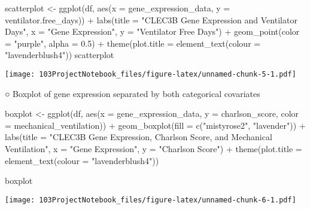 \documentclass[
]{article}
\newenvironment{Shaded}{\begin{snugshade}}{\end{snugshade}}
\newcommand{\AttributeTok}[1]{\textcolor[rgb]{0.77,0.63,0.00}{#1}}
\newcommand{\FloatTok}[1]{\textcolor[rgb]{0.00,0.00,0.81}{#1}}
\newcommand{\FunctionTok}[1]{\textcolor[rgb]{0.00,0.00,0.00}{#1}}
\newcommand{\NormalTok}[1]{#1}
\newcommand{\OtherTok}[1]{\textcolor[rgb]{0.56,0.35,0.01}{#1}}
\newcommand{\SpecialCharTok}[1]{\textcolor[rgb]{0.00,0.00,0.00}{#1}}
\newcommand{\StringTok}[1]{\textcolor[rgb]{0.31,0.60,0.02}{#1}}
\begin{document}
\begin{Shaded}
\begin{Highlighting}[]
\NormalTok{scatterplot }\OtherTok{\textless{}{-}} \FunctionTok{ggplot}\NormalTok{(df, }\FunctionTok{aes}\NormalTok{(}\AttributeTok{x =}\NormalTok{ gene\_expression\_data, }\AttributeTok{y =}\NormalTok{ ventilator.free\_days)) }\SpecialCharTok{+} 
    \FunctionTok{labs}\NormalTok{(}\AttributeTok{title =} \StringTok{"CLEC3B Gene Expression and Ventilator Days"}\NormalTok{, }\AttributeTok{x =} \StringTok{"Gene Expression"}\NormalTok{, }\AttributeTok{y =} \StringTok{"Ventilator Free Days"}\NormalTok{) }\SpecialCharTok{+}
    \FunctionTok{geom\_point}\NormalTok{(}\AttributeTok{color =} \StringTok{"purple"}\NormalTok{, }\AttributeTok{alpha =} \FloatTok{0.5}\NormalTok{) }\SpecialCharTok{+}
    \FunctionTok{theme}\NormalTok{(}\AttributeTok{plot.title =} \FunctionTok{element\_text}\NormalTok{(}\AttributeTok{colour =} \StringTok{"lavenderblush4"}\NormalTok{))}
\NormalTok{scatterplot}
\end{Highlighting}
\end{Shaded}

\texttt{[image: 103ProjectNotebook\_files/figure-latex/unnamed-chunk-5-1.pdf]}

○ Boxplot of gene expression separated by both categorical covariates

\begin{Shaded}
\begin{Highlighting}[]
\NormalTok{boxplot }\OtherTok{\textless{}{-}} \FunctionTok{ggplot}\NormalTok{(df, }\FunctionTok{aes}\NormalTok{(}\AttributeTok{x =}\NormalTok{ gene\_expression\_data, }\AttributeTok{y =}\NormalTok{ charlson\_score, }\AttributeTok{color =}\NormalTok{ mechanical\_ventilation)) }\SpecialCharTok{+} 
  \FunctionTok{geom\_boxplot}\NormalTok{(}\AttributeTok{fill =} \FunctionTok{c}\NormalTok{(}\StringTok{"mistyrose2"}\NormalTok{, }\StringTok{"lavender"}\NormalTok{)) }\SpecialCharTok{+}
  \FunctionTok{labs}\NormalTok{(}\AttributeTok{title =} \StringTok{"CLEC3B Gene Expression, Charlson Score, and Mechanical Ventilation"}\NormalTok{, }\AttributeTok{x =} \StringTok{"Gene Expression"}\NormalTok{, }\AttributeTok{y =} \StringTok{"Charlson Score"}\NormalTok{) }\SpecialCharTok{+} 
  \FunctionTok{theme}\NormalTok{(}\AttributeTok{plot.title =} \FunctionTok{element\_text}\NormalTok{(}\AttributeTok{colour =} \StringTok{"lavenderblush4"}\NormalTok{))}

\NormalTok{boxplot}
\end{Highlighting}
\end{Shaded}

\texttt{[image: 103ProjectNotebook\_files/figure-latex/unnamed-chunk-6-1.pdf]}
\end{document}
